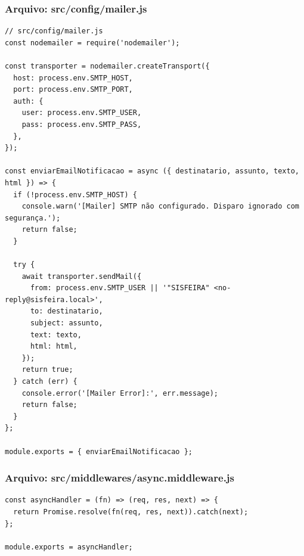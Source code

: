\subsubsection*{Arquivo: src/config/mailer.js}
\begin{lstlisting}[caption={src/config/mailer.js}]
// src/config/mailer.js
const nodemailer = require('nodemailer');

const transporter = nodemailer.createTransport({
  host: process.env.SMTP_HOST,
  port: process.env.SMTP_PORT,
  auth: {
    user: process.env.SMTP_USER,
    pass: process.env.SMTP_PASS,
  },
});

const enviarEmailNotificacao = async ({ destinatario, assunto, texto, html }) => {
  if (!process.env.SMTP_HOST) {
    console.warn('[Mailer] SMTP não configurado. Disparo ignorado com segurança.');
    return false;
  }

  try {
    await transporter.sendMail({
      from: process.env.SMTP_USER || '"SISFEIRA" <no-reply@sisfeira.local>',
      to: destinatario,
      subject: assunto,
      text: texto,
      html: html,
    });
    return true;
  } catch (err) {
    console.error('[Mailer Error]:', err.message);
    return false;
  }
};

module.exports = { enviarEmailNotificacao };\end{lstlisting}
\vspace{0.5cm}
\subsubsection*{Arquivo: src/middlewares/async.middleware.js}
\begin{lstlisting}[caption={src/middlewares/async.middleware.js}]
const asyncHandler = (fn) => (req, res, next) => {
  return Promise.resolve(fn(req, res, next)).catch(next);
};

module.exports = asyncHandler;
\end{lstlisting}
\vspace{0.5cm}
